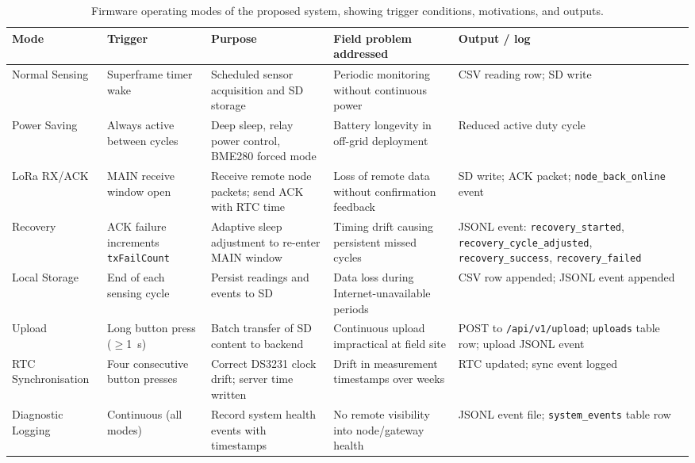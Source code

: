 \begin{table}[H]
\centering
\caption{Firmware operating modes of the proposed system, showing trigger conditions, motivations, and outputs.}
\label{tab:firmware-operating-modes}
\small
\begin{tabular}{p{2.5cm} p{2.8cm} p{3.0cm} p{3.2cm} p{2.5cm}}
\hline
\textbf{Mode} & \textbf{Trigger} & \textbf{Purpose} & \textbf{Field problem addressed} & \textbf{Output / log} \\
\hline
Normal Sensing & Superframe timer wake & Scheduled sensor acquisition and SD storage & Periodic monitoring without continuous power & CSV reading row; SD write \\
\hline
Power Saving & Always active between cycles & Deep sleep, relay power control, BME280 forced mode & Battery longevity in off-grid deployment & Reduced active duty cycle \\
\hline
LoRa RX/ACK & MAIN receive window open & Receive remote node packets; send ACK with RTC time & Loss of remote data without confirmation feedback & SD write; ACK packet; \texttt{node\_back\_online} event \\
\hline
Recovery & ACK failure increments \texttt{txFailCount} & Adaptive sleep adjustment to re-enter MAIN window & Timing drift causing persistent missed cycles & JSONL event: \texttt{recovery\_started}, \texttt{recovery\_cycle\_adjusted}, \texttt{recovery\_success}, \texttt{recovery\_failed} \\
\hline
Local Storage & End of each sensing cycle & Persist readings and events to SD & Data loss during Internet-unavailable periods & CSV row appended; JSONL event appended \\
\hline
Upload & Long button press ($\geq$1~s) & Batch transfer of SD content to backend & Continuous upload impractical at field site & POST to \texttt{/api/v1/upload}; \texttt{uploads} table row; upload JSONL event \\
\hline
RTC Synchronisation & Four consecutive button presses & Correct DS3231 clock drift; server time written & Drift in measurement timestamps over weeks & RTC updated; sync event logged \\
\hline
Diagnostic Logging & Continuous (all modes) & Record system health events with timestamps & No remote visibility into node/gateway health & JSONL event file; \texttt{system\_events} table row \\
\hline
\end{tabular}
\end{table}

